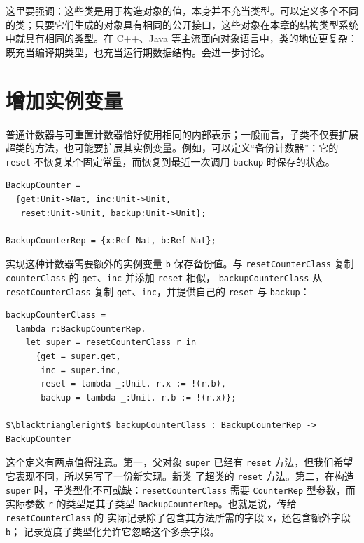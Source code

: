 这里要强调：这些类是用于构造对象的值，本身并不充当类型。可以定义多个不同
的类；只要它们生成的对象具有相同的公开接口，这些对象在本章的结构类型系统
中就具有相同的类型。在 C++、Java 等主流面向对象语言中，类的地位更复杂：
既充当编译期类型，也充当运行期数据结构。会进一步讨论。

\section{增加实例变量}
\label{sec:18.7}

普通计数器与可重置计数器恰好使用相同的内部表示；一般而言，子类不仅要扩展
超类的方法，也可能要扩展其实例变量。例如，可以定义“备份计数器”：它的
\texttt{reset} 不恢复某个固定常量，而恢复到最近一次调用 \texttt{backup}
时保存的状态。

\begin{lstlisting}[mathescape=true]
BackupCounter =
  {get:Unit->Nat, inc:Unit->Unit,
   reset:Unit->Unit, backup:Unit->Unit};

BackupCounterRep = {x:Ref Nat, b:Ref Nat};
\end{lstlisting}

实现这种计数器需要额外的实例变量 \texttt{b} 保存备份值。与
\texttt{resetCounterClass} 复制 \texttt{counterClass} 的
\texttt{get}、\texttt{inc} 并添加 \texttt{reset} 相似，
\texttt{backupCounterClass} 从 \texttt{resetCounterClass} 复制
\texttt{get}、\texttt{inc}，并提供自己的 \texttt{reset} 与
\texttt{backup}：

\begin{lstlisting}[mathescape=true]
backupCounterClass =
  lambda r:BackupCounterRep.
    let super = resetCounterClass r in
      {get = super.get,
       inc = super.inc,
       reset = lambda _:Unit. r.x := !(r.b),
       backup = lambda _:Unit. r.b := !(r.x)};

$\blacktriangleright$ backupCounterClass : BackupCounterRep -> BackupCounter
\end{lstlisting}

这个定义有两点值得注意。第一，父对象 \texttt{super} 已经有
\texttt{reset} 方法，但我们希望它表现不同，所以另写了一份新实现。新类
了超类的 \texttt{reset} 方法。第二，在构造
\texttt{super} 时，子类型化不可或缺：\texttt{resetCounterClass} 需要
\texttt{CounterRep} 型参数，而实际参数 \texttt{r} 的类型是其子类型
\texttt{BackupCounterRep}。也就是说，传给 \texttt{resetCounterClass} 的
实际记录除了包含其方法所需的字段 \texttt{x}，还包含额外字段 \texttt{b}；
记录宽度子类型化允许它忽略这个多余字段。

